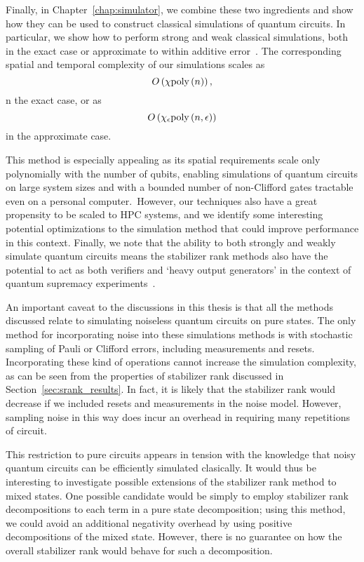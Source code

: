 Finally, in Chapter~\ref{chap:simulator}, we combine these two ingredients and show how they can be used to construct classical simulations of quantum circuits. In particular, we show how to perform strong and weak classical simulations, both in the exact case or approximate to within additive error~\cite{Bravyi2018}. The corresponding spatial and temporal complexity of our simulations scales as
\begin{equation}
O\left(\chi \text{poly}\left(n\right)\right),\label{eq:exact_complexity}
\end{equation} 
n the exact case, or as
\begin{equation}
O\left(\chi_{\epsilon}\text{poly}\left(n,\epsilon\right)\right)\label{eq:approximate_complexity}
\end{equation}in the approximate case.\par
This method is especially appealing as its spatial requirements scale only polynomially with the number of qubits, enabling simulations of quantum circuits on large system sizes and with a bounded number of non-Clifford gates tractable even on a personal computer.\ However, our techniques also have a great propensity to be scaled to HPC systems, and we identify some interesting potential optimizations to the simulation method that could improve performance in this context. Finally, we note that the ability to both strongly and weakly simulate quantum circuits means the stabilizer rank methods also have the potential to act as both verifiers and `heavy output generators' in the context of quantum supremacy experiments~\cite{Aaronson2016}.\par
An important caveat to the discussions in this thesis is that all the methods discussed relate to simulating noiseless quantum circuits on pure states. The only method for incorporating noise into these simulations methods is with stochastic sampling of Pauli or Clifford errors, including measurements and resets. Incorporating these kind of operations cannot increase the simulation complexity, as can be seen from the properties of stabilizer rank discussed in Section~\ref{sec:srank_results}. In fact, it is likely that the stabilizer rank would decrease if we included resets and measurements in the noise model. However, sampling noise in this way does incur an overhead in requiring many repetitions of circuit.\par
This restriction to pure circuits appears in tension with the knowledge that noisy quantum circuits can be efficiently simulated clasically. It would thus be interesting to investigate possible extensions of the stabilizer rank method to mixed states. One possible candidate would be simply to employ stabilizer rank decompositions to each term in a pure state decomposition; using this method, we could avoid an additional negativity overhead by using positive decompositions of the mixed state. However, there is no guarantee on how the overall stabilizer rank would behave for such a decomposition.\par
